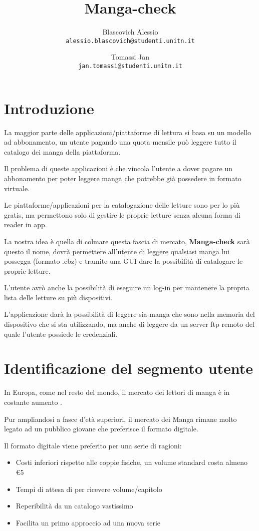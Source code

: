 \documentclass{report}
\title{Manga-check}
\author{Blascovich Alessio\\ 
\texttt{alessio.blascovich@studenti.unitn.it}
\and
Tomassi Jan\\
\texttt{jan.tomassi@studenti.unitn.it}}
\begin{document}
\maketitle

\section{Introduzione}

La maggior parte delle applicazioni/piattaforme di lettura si basa su un
modello ad abbonamento, un utente pagando una quota mensile può leggere
tutto il catalogo dei manga della piattaforma.

Il problema di queste applicazioni è che vincola l'utente a dover pagare
un abbonamento per poter leggere manga che potrebbe già possedere in
formato virtuale.

Le piattaforme/applicazioni per la catalogazione delle letture sono per
lo più gratis, ma permettono solo di gestire le proprie letture senza
alcuna forma di reader in app.

La nostra idea è quella di colmare questa fascia di mercato,
\textbf{Manga-check} sarà questo il nome, dovrà permettere all'utente di
leggere qualsiasi manga lui possegga (formato .cbz) e tramite una GUI
dare la possibilità di catalogare le proprie letture.

L'utente avrò anche la possibilità di eseguire un log-in per mantenere
la propria lista delle letture su più dispositivi.

L'applicazione darà la possibilità di leggere sia manga che sono nella
memoria del dispositivo che si sta utilizzando, ma anche di leggere da
un server ftp remoto del quale l'utente possiede le credenziali.

\section{Identificazione del segmento utente}

In Europa, come nel resto del mondo, il mercato dei lettori di manga è
in costante aumento \cite{mangaOut}.

Pur ampliandosi a fasce d'età superiori, il mercato dei Manga rimane
molto legato ad un pubblico giovane che preferisce il formato digitale.

Il formato digitale viene preferito per una serie di ragioni:

\begin{itemize}
	\item Costi inferiori rispetto alle coppie fisiche, un volume standard costa almeno \euro{5} 
	\item Tempi di attesa di per ricevere volume/capitolo
	\item Reperibilità da un catalogo vastissimo
	\item Facilita un primo approccio ad una nuova serie
\end{itemize}
\end{document}
